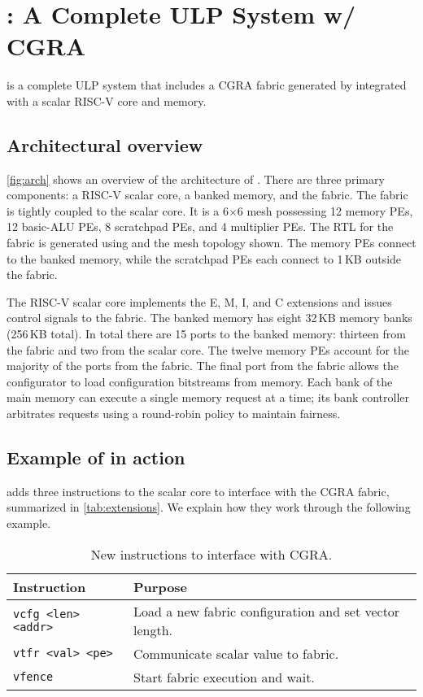 \section{\snafuarch: A Complete ULP System w/ CGRA}
\label{snafu:arch}
 
\snafuarch is a complete ULP system that includes a CGRA fabric generated by \snafuframe
integrated with a scalar RISC-V core and memory.

\subsection{Architectural overview}
\autoref{fig:arch} shows an overview of the architecture of \snafuarch.
% 
There are three primary components: a \mbox{RISC-V} scalar core, a banked memory, and the \snafuframe fabric.
% 
The \snafu fabric is tightly coupled to the scalar core.
% 
It is a 6$\times$6 mesh possessing 12 memory PEs, 12 basic-ALU PEs, 8 scratchpad PEs, and 4 multiplier PEs.
% 
The RTL for the fabric is generated using \snafuframe and the mesh topology shown.
%
The memory PEs connect to the banked memory, while the scratchpad PEs each connect to 1\,KB outside the fabric.

\figSNAFUArch

The RISC-V scalar core implements the E, M, I, and C extensions and issues control signals to the \snafuframe fabric.
% 
The banked memory has eight 32\,KB memory banks (256\,KB total). 
% 
In total there are 15 ports to the banked memory: thirteen from the \snafuframe fabric and two from the scalar core.
% 
The twelve memory PEs account for the majority of the ports from the fabric.
% 
The final port from the fabric allows the \snafuframe configurator to load configuration bitstreams from memory.
% 
Each bank of the main memory can execute a single memory request at a time; its bank controller arbitrates requests using a round-robin policy to maintain fairness.

\subsection{Example of \snafuarch in action}

\snafuarch adds three instructions to the scalar core to interface with the CGRA fabric,
summarized in \autoref{tab:extensions}.
We explain how they work through the following example.

\begin{table}[t]
  \centering
  \footnotesize
  \begin{tabular}{lp{1.85in}}
    \toprule
    \bf Instruction & \bf Purpose \\
    \midrule
    {\tt vcfg <len> <addr>} & Load a new fabric configuration and set vector length. \\
    {\tt vtfr <val> <pe>} & Communicate scalar value to fabric. \\
    {\tt vfence} & Start fabric execution and wait. \\
    \bottomrule
  \end{tabular}
  \caption{New instructions to interface with CGRA.}
  \label{tab:extensions}
\end{table}

